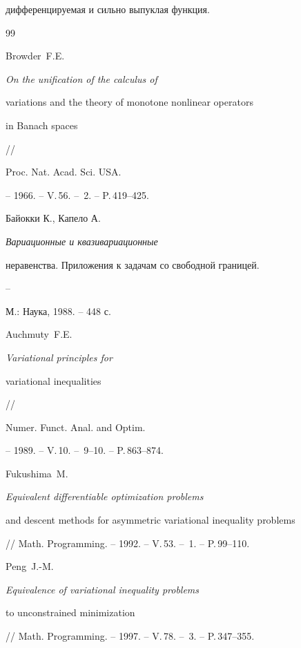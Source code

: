 дифференцируемая и сильно выпуклая функция.








\begin{thebibliography}{99}







Browder~F.E. {\em On the unification of the calculus of


variations and the theory of monotone nonlinear operators


in Banach spaces} //


Proc. Nat. Acad. Sci. USA.


-- 1966. -- V.\,56. -- \No\,2. -- P.\,419--425.







Байокки К., Капело А. {\em Вариационные и квазивариационные


неравенства. Приложения к задачам со свободной границей.} --


М.: Наука, 1988. -- 448 с.







Auchmuty~F.E. {\em Variational principles for


variational inequalities} //


Numer. Funct. Anal. and Optim.


-- 1989. -- V.\,10. -- \No\,9--10. -- P.\,863--874.







Fukushima~M. {\em Equivalent differentiable optimization problems


and descent methods for asymmetric variational inequality problems}


// Math. Programming. -- 1992. -- V.\,53. -- \No\,1. -- P.\,99--110.







Peng~J.-M. {\em Equivalence of variational inequality problems


to unconstrained minimization}


// Math. Programming. -- 1997. -- V.\,78. -- \No\,3. -- P.\,347--355.






\end{thebibliography}
